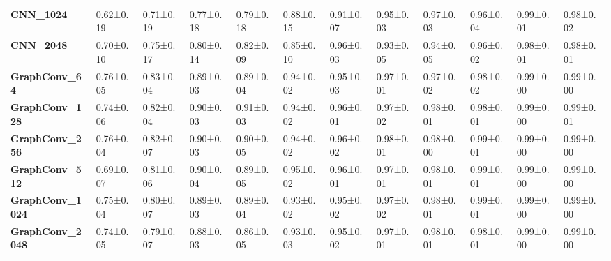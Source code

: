 \begin{tabular}{llllllllllll}
\textbf{CNN\_1024      } &   0.62±0.19 &  0.71±0.19 &  0.77±0.18 &  0.79±0.18 &  0.88±0.15 &  0.91±0.07 &  0.95±0.03 &  0.97±0.03 &  0.96±0.04 &   0.99±0.01 &   0.98±0.02 \\
\textbf{CNN\_2048      } &   0.70±0.10 &  0.75±0.17 &  0.80±0.14 &  0.82±0.09 &  0.85±0.10 &  0.96±0.03 &  0.93±0.05 &  0.94±0.05 &  0.96±0.02 &   0.98±0.01 &   0.98±0.01 \\
\textbf{GraphConv\_64  } &   0.76±0.05 &  0.83±0.04 &  0.89±0.03 &  0.89±0.04 &  0.94±0.02 &  0.95±0.03 &  0.97±0.01 &  0.97±0.02 &  0.98±0.02 &   0.99±0.00 &   0.99±0.00 \\
\textbf{GraphConv\_128 } &   0.74±0.06 &  0.82±0.04 &  0.90±0.03 &  0.91±0.03 &  0.94±0.02 &  0.96±0.01 &  0.97±0.02 &  0.98±0.01 &  0.98±0.01 &   0.99±0.00 &   0.99±0.01 \\
\textbf{GraphConv\_256 } &   0.76±0.04 &  0.82±0.07 &  0.90±0.03 &  0.90±0.05 &  0.94±0.02 &  0.96±0.02 &  0.98±0.01 &  0.98±0.00 &  0.99±0.01 &   0.99±0.00 &   0.99±0.00 \\
\textbf{GraphConv\_512 } &   0.69±0.07 &  0.81±0.06 &  0.90±0.04 &  0.89±0.05 &  0.95±0.02 &  0.96±0.01 &  0.97±0.01 &  0.98±0.01 &  0.99±0.01 &   0.99±0.00 &   0.99±0.00 \\
\textbf{GraphConv\_1024} &   0.75±0.04 &  0.80±0.07 &  0.89±0.03 &  0.89±0.04 &  0.93±0.02 &  0.95±0.02 &  0.97±0.02 &  0.98±0.01 &  0.99±0.01 &   0.99±0.00 &   0.99±0.00 \\
\textbf{GraphConv\_2048} &   0.74±0.05 &  0.79±0.07 &  0.88±0.03 &  0.86±0.05 &  0.93±0.03 &  0.95±0.02 &  0.97±0.01 &  0.98±0.01 &  0.98±0.01 &   0.99±0.00 &   0.99±0.00 \\
\bottomrule
\end{tabular}
